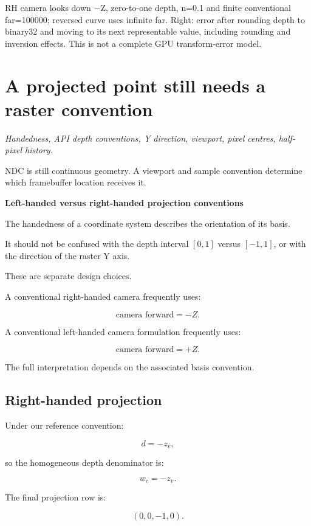 RH camera looks down −Z, zero-to-one depth, n=0.1 and finite conventional far=100000; reversed curve uses infinite far. Right: error after rounding depth to binary32 and moving to its next representable value, including rounding and inversion effects. This is not a complete GPU transform-error model.

\section{A projected point still needs a raster convention}\label{02-foundations-ii-ch033-a-projected-point-still-needs-a-raster-convention}

\emph{Handedness, API depth conventions, Y direction, viewport, pixel centres, half-pixel history.}

NDC is still continuous geometry. A viewport and sample convention determine which framebuffer location receives it.

\textbf{Left-handed versus right-handed projection conventions}

The handedness of a coordinate system describes the orientation of its basis.

It should not be confused with the depth interval \([0,1]\) versus \([-1,1]\), or with the direction of the raster Y axis.

These are separate design choices.

A conventional right-handed camera frequently uses:

\[
 \boxed{ \text{camera forward}=-Z }.
\]

A conventional left-handed camera formulation frequently uses:

\[
 \boxed{ \text{camera forward}=+Z }.
\]

The full interpretation depends on the associated basis convention.

\subsection{Right-handed projection}\label{02-foundations-ii-ch033-right-handed-projection}

Under our reference convention:

\[
 d=-z_v,
\]

so the homogeneous depth denominator is:

\[
 \boxed{w_c=-z_v}.
\]

The final projection row is:

\[
 \boxed{ (0,0,-1,0) }.
\]

